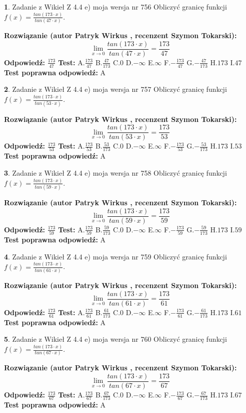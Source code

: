 \documentclass[12pt, a4paper]{article}
\theoremstyle{definition} %
\newtheorem{zad}{}
\newcommand{\zadStart}[1]{\begin{zad}#1\newline}
\newcommand{\zadStop}{\end{zad}}
\newcommand{\rozwStart}[2]{\noindent \textbf{Rozwiązanie (autor #1 , recenzent #2): }\newline}
\newcommand{\rozwStop}{\newline}
\newcommand{\odpStart}{\noindent \textbf{Odpowiedź:}\newline}
\newcommand{\odpStop}{\newline}
\newcommand{\testStart}{\noindent \textbf{Test:}\newline}
\newcommand{\testStop}{\newline}
\newcommand{\kluczStart}{\noindent \textbf{Test poprawna odpowiedź:}\newline}
\newcommand{\kluczStop}{\newline}
\begin{document}
\zadStart{Zadanie z Wikieł Z 4.4 e) moja wersja nr 756}
Obliczyć granicę funkcji $f(x)=\frac{tan(173\cdot x)}{tan(47\cdot x)}$.
\zadStop
\rozwStart{Patryk Wirkus}{Szymon Tokarski}
$$\lim\limits_{x\to 0}\frac{tan(173\cdot x)}{tan(47\cdot x)}=
\frac{173}{47}$$
\rozwStop
\odpStart
$\frac{173}{47}$
\odpStop
\testStart
A.$\frac{173}{47}$
B.$\frac{47}{173}$
C.$0$
D.$-\infty$
E.$\infty$
F.$-\frac{173}{47}$
G.$-\frac{47}{173}$
H.$173$
I.$47$
\testStop
\kluczStart
A
\kluczStop



\zadStart{Zadanie z Wikieł Z 4.4 e) moja wersja nr 757}
Obliczyć granicę funkcji $f(x)=\frac{tan(173\cdot x)}{tan(53\cdot x)}$.
\zadStop
\rozwStart{Patryk Wirkus}{Szymon Tokarski}
$$\lim\limits_{x\to 0}\frac{tan(173\cdot x)}{tan(53\cdot x)}=
\frac{173}{53}$$
\rozwStop
\odpStart
$\frac{173}{53}$
\odpStop
\testStart
A.$\frac{173}{53}$
B.$\frac{53}{173}$
C.$0$
D.$-\infty$
E.$\infty$
F.$-\frac{173}{53}$
G.$-\frac{53}{173}$
H.$173$
I.$53$
\testStop
\kluczStart
A
\kluczStop



\zadStart{Zadanie z Wikieł Z 4.4 e) moja wersja nr 758}
Obliczyć granicę funkcji $f(x)=\frac{tan(173\cdot x)}{tan(59\cdot x)}$.
\zadStop
\rozwStart{Patryk Wirkus}{Szymon Tokarski}
$$\lim\limits_{x\to 0}\frac{tan(173\cdot x)}{tan(59\cdot x)}=
\frac{173}{59}$$
\rozwStop
\odpStart
$\frac{173}{59}$
\odpStop
\testStart
A.$\frac{173}{59}$
B.$\frac{59}{173}$
C.$0$
D.$-\infty$
E.$\infty$
F.$-\frac{173}{59}$
G.$-\frac{59}{173}$
H.$173$
I.$59$
\testStop
\kluczStart
A
\kluczStop



\zadStart{Zadanie z Wikieł Z 4.4 e) moja wersja nr 759}
Obliczyć granicę funkcji $f(x)=\frac{tan(173\cdot x)}{tan(61\cdot x)}$.
\zadStop
\rozwStart{Patryk Wirkus}{Szymon Tokarski}
$$\lim\limits_{x\to 0}\frac{tan(173\cdot x)}{tan(61\cdot x)}=
\frac{173}{61}$$
\rozwStop
\odpStart
$\frac{173}{61}$
\odpStop
\testStart
A.$\frac{173}{61}$
B.$\frac{61}{173}$
C.$0$
D.$-\infty$
E.$\infty$
F.$-\frac{173}{61}$
G.$-\frac{61}{173}$
H.$173$
I.$61$
\testStop
\kluczStart
A
\kluczStop



\zadStart{Zadanie z Wikieł Z 4.4 e) moja wersja nr 760}
Obliczyć granicę funkcji $f(x)=\frac{tan(173\cdot x)}{tan(67\cdot x)}$.
\zadStop
\rozwStart{Patryk Wirkus}{Szymon Tokarski}
$$\lim\limits_{x\to 0}\frac{tan(173\cdot x)}{tan(67\cdot x)}=
\frac{173}{67}$$
\rozwStop
\odpStart
$\frac{173}{67}$
\odpStop
\testStart
A.$\frac{173}{67}$
B.$\frac{67}{173}$
C.$0$
D.$-\infty$
E.$\infty$
F.$-\frac{173}{67}$
G.$-\frac{67}{173}$
H.$173$
I.$67$
\testStop
\kluczStart
A
\kluczStop
\end{document}
